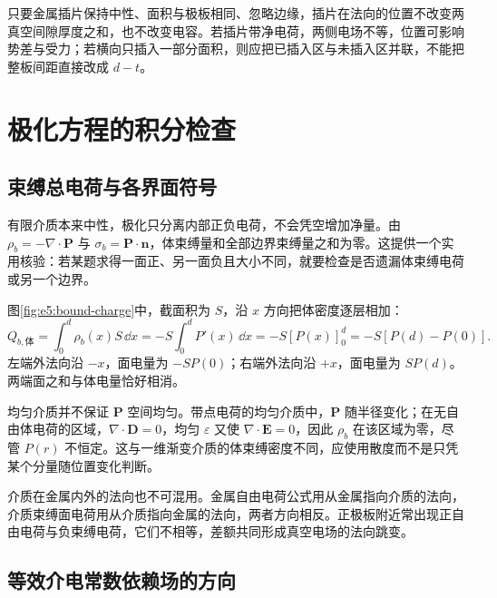 只要金属插片保持中性、面积与极板相同、忽略边缘，插片在法向的位置不改变两真空间隙厚度之和，也不改变电容。若插片带净电荷，两侧电场不等，位置可影响势差与受力；若横向只插入一部分面积，则应把已插入区与未插入区并联，不能把整板间距直接改成 $d-t$。


\section{极化方程的积分检查}
\subsection{束缚总电荷与各界面符号}

有限介质本来中性，极化只分离内部正负电荷，不会凭空增加净量。由 $\rho_b=-\nabla\cdot\bm P$ 与 $\sigma_b=\bm P\cdot\bm n$，体束缚量和全部边界束缚量之和为零。这提供一个实用核验：若某题求得一面正、另一面负且大小不同，就要检查是否遗漏体束缚电荷或另一个边界。

\par 图\ref{fig:e5:bound-charge}中，截面积为 $S$，沿 $x$ 方向把体密度逐层相加：
\[
Q_{b,\text{体}}=\int_0^d\rho_b(x)S\,\dd x
=-S\int_0^d P'(x)\,\dd x
=-S[P(x)]_0^d=-S[P(d)-P(0)].
\]
左端外法向沿 $-x$，面电量为 $-SP(0)$；右端外法向沿 $+x$，面电量为 $SP(d)$。两端面之和与体电量恰好相消。

均匀介质并不保证 $\bm P$ 空间均匀。带点电荷的均匀介质中，$\bm P$ 随半径变化；在无自由体电荷的区域，$\nabla\cdot\bm D=0$，均匀 $\varepsilon$ 又使 $\nabla\cdot\bm E=0$，因此 $\rho_b$ 在该区域为零，尽管 $P(r)$ 不恒定。这与一维渐变介质的体束缚密度不同，应使用散度而不是只凭某个分量随位置变化判断。

介质在金属内外的法向也不可混用。金属自由电荷公式用从金属指向介质的法向，介质束缚面电荷用从介质指向金属的法向，两者方向相反。正极板附近常出现正自由电荷与负束缚电荷，它们不相等，差额共同形成真空电场的法向跳变。

\subsection{等效介电常数依赖场的方向}

